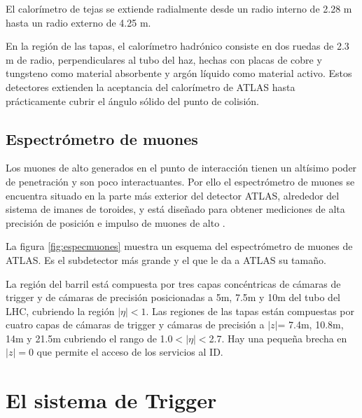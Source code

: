 El calorímetro de tejas se extiende radialmente desde un radio interno de 2.28 m
hasta un radio externo de 4.25 m.

En la región de las tapas, el calorímetro hadrónico consiste en dos ruedas de
2.3 m de radio, perpendiculares al tubo del haz, hechas con placas de cobre y
tungsteno como material absorbente y argón líquido como material activo. Estos
detectores extienden la aceptancia del calorímetro de ATLAS hasta prácticamente
cubrir el ángulo sólido del punto de colisión.


\subsection{Espectrómetro de muones}
Los muones de alto {\pt} generados en el punto de interacción tienen un altísimo
poder de penetración y son poco interactuantes. Por ello el espectrómetro de
muones \cite{muonTDR} se encuentra situado en la parte más exterior del detector
ATLAS, alrededor del sistema de imanes de toroides, y está diseñado para obtener
mediciones de alta precisión de posición e impulso de muones de alto \pt.


La figura \ref{fig:especmuones} muestra un esquema del espectrómetro de muones
de ATLAS. Es el subdetector más grande y el que le da a ATLAS su tamaño.

La región del barril está compuesta por tres capas concéntricas de cámaras de
trigger y de cámaras de precisión posicionadas a 5m, 7.5m y 10m del tubo del
LHC, cubriendo la región $|\eta|<1$. Las regiones de las tapas están compuestas
por cuatro capas de cámaras de trigger y cámaras de precisión a $|z|$= 7.4m,
10.8m, 14m y 21.5m cubriendo el rango de 1.0$<|\eta|<$2.7. Hay una pequeña
brecha en $|z|=0$ que permite el acceso de los servicios al ID.

\section{El sistema de Trigger}

